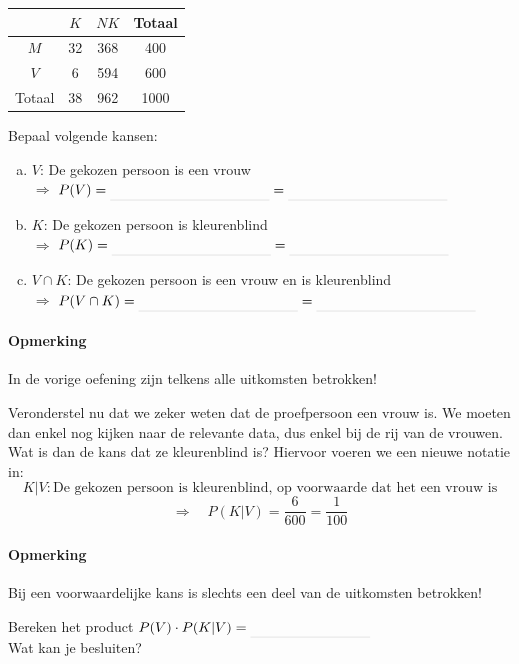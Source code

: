 \documentclass[12pt,twoside]{article}
\begin{document}
\begin{center}
  \begin{tabular}{c|c|c|c}
         &  $K$ &  $NK$ & Totaal\\
  \hline
  $M$      & 32 & 368 & 400\\
  $V$      &  6 & 594 & 600\\
  \hline
  Totaal & 38 & 962 & 1000
  \end{tabular}
\end{center}

\begin{oefening}
Bepaal volgende kansen:
\begin{enumerate}[(a)]
  \item $V$: De gekozen persoon is een vrouw\\$\Rightarrow$ $P(V)=\arule{4cm}=\arule{4cm}$
  \item $K$: De gekozen persoon is kleurenblind\\$\Rightarrow$ $P(K)=\arule{4cm}=\arule{4cm}$
  \item $V\cap K$: De gekozen persoon is een vrouw en is kleurenblind\\$\Rightarrow$ $P(V\cap K)=\arule{4cm}=\arule{4cm}$
\end{enumerate}
\end{oefening}

\paragraph*{Opmerking} In de vorige oefening zijn telkens alle uitkomsten betrokken!

Veronderstel nu dat we zeker weten dat de proefpersoon een vrouw is. We moeten dan enkel nog kijken naar de relevante data, dus enkel bij de rij van de vrouwen. Wat is dan de kans dat ze kleurenblind is? Hiervoor voeren we een nieuwe notatie in:
$$K|V:\mbox{De gekozen persoon is kleurenblind, op voorwaarde dat het een vrouw is}$$
$$\Rightarrow\quad P(K|V)=\dfrac{6}{600}=\dfrac{1}{100}$$

\paragraph*{Opmerking} Bij een voorwaardelijke kans is slechts een deel van de uitkomsten betrokken!

\begin{oefening}
Bereken het product $P(V)\cdot P(K|V)=\arule{3cm}$\\
Wat kan je besluiten?
\end{oefening}
\end{document}
